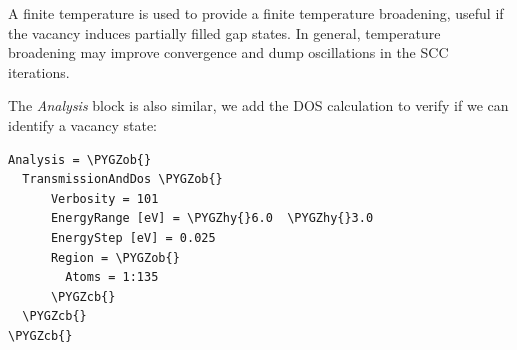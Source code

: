 \documentclass[a4paper,11pt,english]{sphinxmanual}
\def\PYGZob{\char`\{}
\def\PYGZcb{\char`\}}
\def\PYGZhy{\char`\-}
\begin{document}
{{A finite temperature is used to provide a finite temperature
broadening, useful if the vacancy induces partially filled gap
states. In general, temperature broadening may improve convergence and
dump oscillations in the SCC iterations.

The \emph{Analysis} block is also similar, we add the DOS calculation to
verify if we can identify a vacancy state:

\begin{Verbatim}[commandchars=\\\{\}]
Analysis = \PYGZob{}
  TransmissionAndDos \PYGZob{}
      Verbosity = 101
      EnergyRange [eV] = \PYGZhy{}6.0  \PYGZhy{}3.0
      EnergyStep [eV] = 0.025
      Region = \PYGZob{}
        Atoms = 1:135
      \PYGZcb{}
  \PYGZcb{}
\PYGZcb{}
\end{Verbatim}

}}
\end{document}
